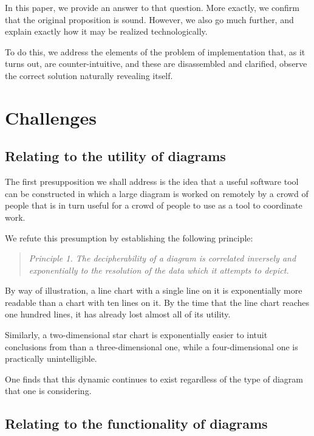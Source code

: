 \documentclass{article}
\begin{document}
\begin{multicols}{2}
In this paper, we provide an answer to that question. More exactly, we confirm that the original proposition is sound. However, we also go much further, and explain exactly how it may be realized technologically.

To do this, we address the elements of the problem of implementation that, as it turns out, are counter-intuitive, and these are disassembled and clarified, observe the correct solution naturally revealing itself.

\section{Challenges}

\subsection{Relating to the utility of diagrams}

The first presupposition we shall address is the idea that a useful software tool can be constructed in which a large diagram is worked on remotely by a crowd of people that is in turn useful for a crowd of people to use as a tool to coordinate work.

We refute this presumption by establishing the following principle:

\begin{quote}

\textit{Principle 1. The decipherability of a diagram is correlated inversely and exponentially to the resolution of the data which it attempts to depict.
}
\end{quote} \phantom{[FIGURE 1]}

By way of illustration, a line chart with a single line on it is exponentially more readable than a chart with ten lines on it. By the time that the line chart reaches one hundred lines, it has already lost almost all of its utility. \phantom{[FIGURE 2]}


Similarly, a two-dimensional star chart is exponentially easier to intuit conclusions from than a three-dimensional one, while a four-dimensional one is practically unintelligible.

One finds that this dynamic continues to exist regardless of the type of diagram that one is considering.

\subsection{Relating to the functionality of diagrams}


\end{multicols}
\end{document}
